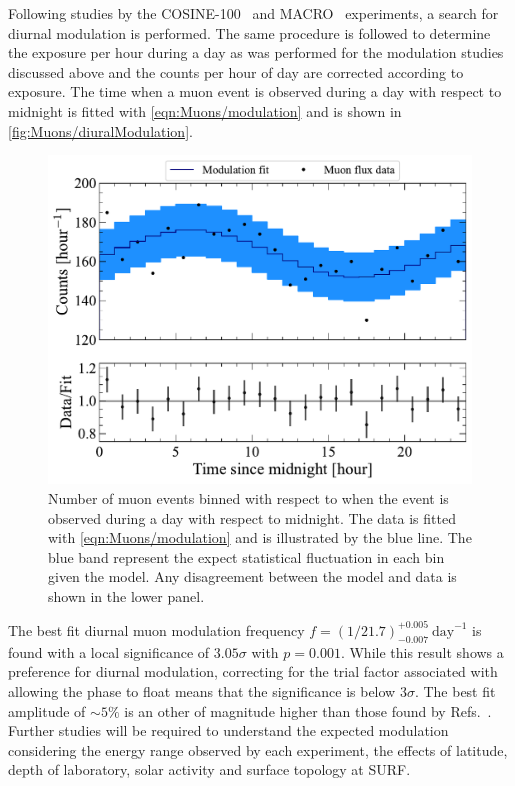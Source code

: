 Following studies by the COSINE-100~\cite{COSINE-100:2020jml} and MACRO~\cite{AMBROSIO1997109} experiments, a search for diurnal modulation is performed. The same procedure is followed to determine the exposure per hour during a day as was performed for the modulation studies discussed above and the counts per hour of day are corrected according to exposure. The time when a muon event is observed during a day with respect to midnight is fitted with \autoref{eqn:Muons/modulation} and is shown in \autoref{fig:Muons/diuralModulation}.
\begin{figure}
    \centering
    \includegraphics[width=0.8\linewidth]{figures/Muons/MuonModulation_TripleCoin.pdf}
    \caption[Diurnal muon modulation in muon flux data set.]{Number of muon events binned with respect to when the event is observed during a day with respect to midnight. The data is fitted with \autoref{eqn:Muons/modulation} and is illustrated by the blue line. The blue band represent the expect statistical fluctuation in each bin given the model. Any disagreement between the model and data is shown in the lower panel.}
    \label{fig:Muons/diuralModulation}
\end{figure}
The best fit diurnal muon modulation frequency $f=(1/21.7)^{+0.005}_{-0.007}~\text{day}^{-1}$ is found with a local significance of $3.05\sigma$ with $p=0.001$. While this result shows a preference for diurnal modulation, correcting for the trial factor associated with allowing the phase to float means that the significance is below $3\sigma$. The best fit amplitude of $\sim5\%$ is an other of magnitude higher than those found by Refs.~\cite{COSINE-100:2020jml,AMBROSIO1997109}. Further studies will be required to understand the expected modulation considering the energy range observed by each experiment, the effects of latitude, depth of laboratory, solar activity and surface topology at SURF.

